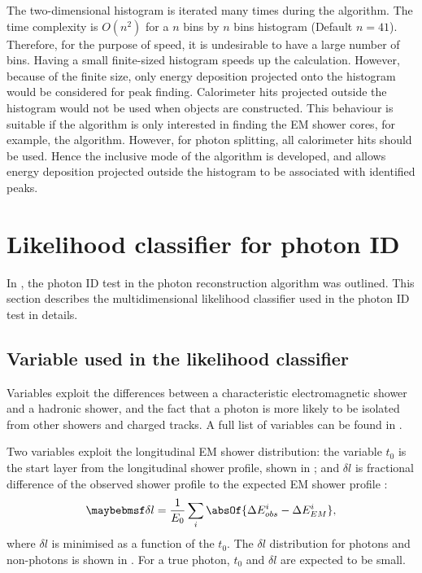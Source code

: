 The two-dimensional histogram is iterated many times during the algorithm. The time complexity is $O(n^2)$ for a $n$ bins by  $n$ bins histogram (Default $n = 41$). Therefore, for the purpose of speed, it is undesirable to have  a large number of bins. Having a small finite-sized histogram speeds up the calculation. However, because of the finite size, only energy deposition projected onto the histogram would be considered for peak finding. Calorimeter hits projected outside the histogram would not be used when \ShowerPeak objects are constructed. This behaviour is suitable if the algorithm is only interested in finding the EM shower cores, for example, the \PhotonReconstruction algorithm. However, for photon splitting, all calorimeter hits should be used. Hence the inclusive mode of the \peakFinding algorithm is developed, and allows energy deposition projected outside the histogram to be associated with identified peaks.


\section{Likelihood classifier for photon ID}
\label{sec:photonLikelihood}

In , the photon ID test in the photon reconstruction algorithm was outlined. This section describes the multidimensional likelihood classifier used in the photon ID test in details.


\subsection{Variable used in the likelihood classifier}

Variables exploit the differences between a characteristic electromagnetic shower and a hadronic shower, and the fact that a photon is more likely to be isolated from other showers and charged tracks. A full list of variables can be found in .

Two variables exploit the longitudinal EM shower distribution: the variable $t_0$ is the start layer from the longitudinal shower profile, shown in ; and $\delta{l}$ is fractional difference of the observed shower profile to the expected EM shower profile \cite{Thomson:2009rp}:
\begin{equation}
\delta l = \frac{1}{E_0}\sum_{i}^{}\absOf{\Delta E_{obs}^i - \Delta E_{EM}^i },
\end{equation}
where $\delta l$ is minimised as a function of the $t_0$. The $\delta l$ distribution for photons and non-photons is shown in . For a true photon, $t_0$  and $\delta l $ are expected to be small.

